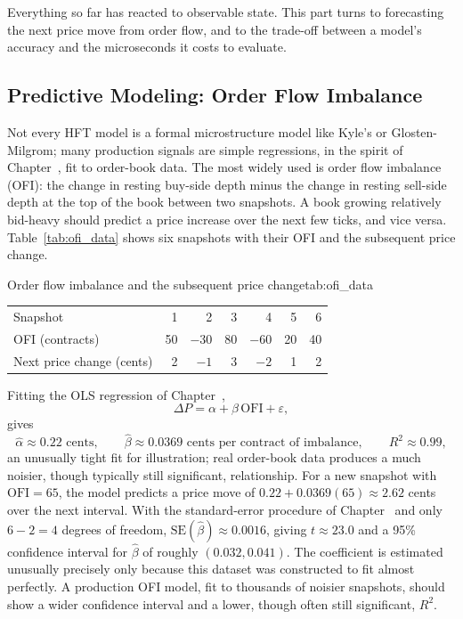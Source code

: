 \documentclass[../ai_in_finance]{subfiles}
\begin{document}
Everything so far has reacted to observable state. This part turns to forecasting the next price move from order flow, and to the trade-off between a model's accuracy and the microseconds it costs to evaluate.

\subsection{Predictive Modeling: Order Flow Imbalance}
\label{sec:ofi}

Not every HFT model is a formal microstructure model like Kyle's or Glosten-Milgrom; many production signals are simple regressions, in the spirit of Chapter~, fit to order-book data. The most widely used is order flow imbalance (OFI): the change in resting buy-side depth minus the change in resting sell-side depth at the top of the book between two snapshots. A book growing relatively bid-heavy should predict a price increase over the next few ticks, and vice versa. Table~\ref{tab:ofi_data} shows six snapshots with their OFI and the subsequent price change.

\begin{booktable}[htbp]{Order flow imbalance and the subsequent price change}{tab:ofi_data}
\begin{tabular}{lrrrrrr}
\toprule
Snapshot & 1 & 2 & 3 & 4 & 5 & 6 \\
OFI (contracts) & 50 & $-30$ & 80 & $-60$ & 20 & 40 \\
Next price change (cents) & 2 & $-1$ & 3 & $-2$ & 1 & 2 \\
\bottomrule
\end{tabular}
\end{booktable}

Fitting the OLS regression of Chapter~,
\begin{equation}
\Delta P = \alpha + \beta\,\text{OFI} + \varepsilon,
\label{eq:hft-ofi}
\end{equation}
gives
\begin{equation*}
\hat\alpha \approx 0.22 \text{ cents}, \qquad \hat\beta \approx 0.0369 \text{ cents per contract of imbalance}, \qquad R^2 \approx 0.99,
\end{equation*}
an unusually tight fit for illustration; real order-book data produces a much noisier, though typically still significant, relationship. For a new snapshot with $\text{OFI}=65$, the model predicts a price move of $0.22 + 0.0369(65) \approx 2.62$ cents over the next interval. With the standard-error procedure of Chapter~ and only $6-2=4$ degrees of freedom, $\text{SE}(\hat\beta) \approx 0.0016$, giving $t\approx 23.0$ and a 95\% confidence interval for $\hat\beta$ of roughly $(0.032, 0.041)$. The coefficient is estimated unusually precisely only because this dataset was constructed to fit almost perfectly. A production OFI model, fit to thousands of noisier snapshots, should show a wider confidence interval and a lower, though often still significant, $R^2$.
\end{document}
